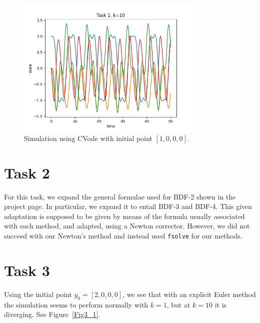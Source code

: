 \documentclass{article}
\begin{document}


\begin{figure}[H]
\centering
\includegraphics[width=0.80\textwidth]{Task1_figs/Figure_1_10_2.png}
\caption{Simulation using CVode with initial point \(\left[1,0,0,0\right]\).}
\label{Fig1_4}
\end{figure}

\section{Task 2}
For this task, we expand the general formulae used for BDF-2 shown in the project page. In particular, we expand it to entail BDF-3 and BDF-4. This given adaptation is supposed to be given by means of the formula usually associated with each method, and adapted, using a Newton corrector. However, we did not succeed with our Newton's method and instead used  \texttt{fsolve} for our methods.

\section{Task 3} \label{Sec:3}
Using the initial point \(y_0 = \left[2,0,0,0\right]\), we see that with an explicit Euler method the simulation seems to perform normally with \(k=1\), but at \(k=10\) it is diverging. See Figure~\ref{Fig3_1}.
\end{document}
